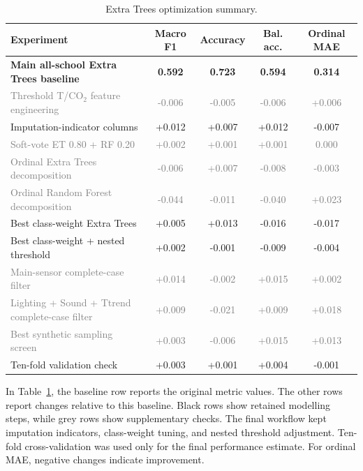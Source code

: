﻿\documentclass[11pt]{article}
\newcommand{\notretained}[1]{\textcolor{gray}{#1}}
\begin{document}
{\begin{table}[H]
    \centering
    \small
    \caption{Extra Trees optimization summary.}
    \label{tab:ieq-ablation-summary}
    \begin{tabular}{p{6.0cm}cccc}
        \hline
        Experiment & Macro F1 & Accuracy & Bal. acc. & Ordinal MAE \\
        \hline
        \textbf{Main all-school Extra Trees baseline} & \textbf{0.592} & \textbf{0.723} & \textbf{0.594} & \textbf{0.314} \\
        \notretained{Threshold T/CO$_2$ feature engineering} & \notretained{-0.006} & \notretained{-0.005} & \notretained{-0.006} & \notretained{+0.006} \\
        Imputation-indicator columns & +0.012 & +0.007 & +0.012 & -0.007 \\
        \notretained{Soft-vote ET 0.80 + RF 0.20} & \notretained{+0.002} & \notretained{+0.001} & \notretained{+0.001} & \notretained{0.000} \\
        \notretained{Ordinal Extra Trees decomposition} & \notretained{-0.006} & \notretained{+0.007} & \notretained{-0.008} & \notretained{-0.003} \\
        \notretained{Ordinal Random Forest decomposition} & \notretained{-0.044} & \notretained{-0.011} & \notretained{-0.040} & \notretained{+0.023} \\
        Best class-weight Extra Trees & +0.005 & +0.013 & -0.016 & -0.017 \\
        Best class-weight + nested threshold & +0.002 & -0.001 & -0.009 & -0.004 \\
        \notretained{Main-sensor complete-case filter} & \notretained{+0.014} & \notretained{-0.002} & \notretained{+0.015} & \notretained{+0.002} \\
        \notretained{Lighting + Sound + Ttrend complete-case filter} & \notretained{+0.009} & \notretained{-0.021} & \notretained{+0.009} & \notretained{+0.018} \\
        \notretained{Best synthetic sampling screen} & \notretained{+0.003} & \notretained{-0.006} & \notretained{+0.015} & \notretained{+0.013} \\
        Ten-fold validation check & +0.003 & +0.001 & +0.004 & -0.001 \\
        \hline
    \end{tabular}
\end{table}

In Table~\ref{tab:ieq-ablation-summary}, the baseline row reports the original metric values. The other rows report changes relative to this baseline. Black rows show retained modelling steps, while grey rows show supplementary checks. The final workflow kept imputation indicators, class-weight tuning, and nested threshold adjustment. Ten-fold cross-validation was used only for the final performance estimate. For ordinal MAE, negative changes indicate improvement.}
\end{document}
